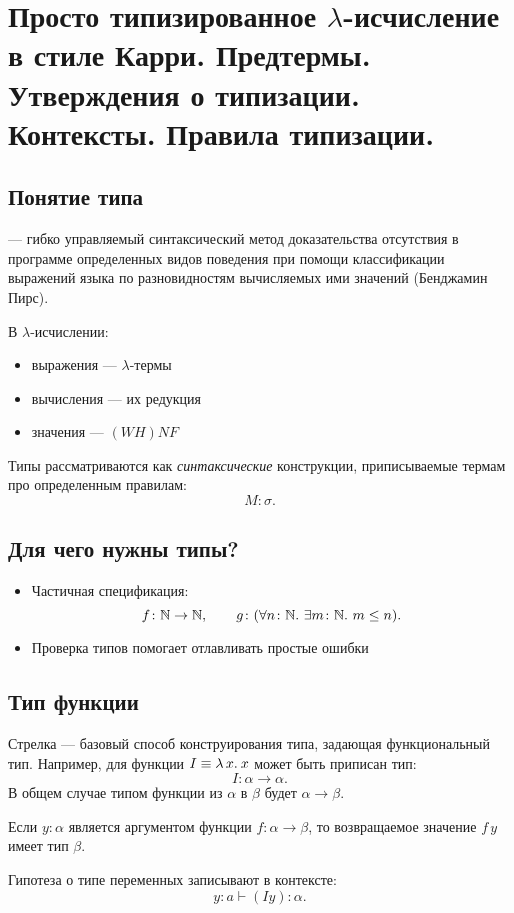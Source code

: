 \documentclass[11pt,a4paper]{article}
\begin{document}
\section{Просто типизированное $ \lambda$-исчисление в стиле Карри. Предтермы. Утверждения о типизации. Контексты. Правила типизации.}
\subsection{Понятие типа}
 --- гибко управляемый синтаксический метод доказательства отсутствия в программе определенных видов поведения при помощи классификации выражений языка по разновидностям вычисляемых ими значений (Бенджамин Пирс). 

В $ \lambda $-исчислении:
\begin{itemize}
	\item выражения --- $ \lambda$-термы
	\item вычисления --- их редукция
	\item значения ---  $ (WH)NF$
\end{itemize}
Типы рассматриваются как \textit{синтаксические} конструкции, приписываемые термам про определенным правилам:
\[
M \colon \sigma 
.\] 
\subsection{Для чего нужны типы?}
\begin{itemize}
	\item Частичная спецификация:
		\[
			f\colon \mathbb{N} \to  \mathbb{N}, \qquad g\colon ( \forall n \colon \mathbb{N}. ~ \exists m\colon \mathbb{N}. ~ m \le  n)
		.\] 
	\item Проверка типов помогает отлавливать простые ошибки
\end{itemize}
\subsection{Тип функции}
Стрелка --- базовый способ конструирования типа, задающая функциональный тип. Например, для функции $ I \equiv \lambda\,{x}.\:{x}$ может быть приписан тип:
\[
I \colon \alpha \to \alpha 
.\] 
В общем случае типом функции из $ \alpha $ в $ \beta $ будет $ \alpha \to  \beta $.

Если $ y\colon \alpha $ является аргументом функции $ f\colon \alpha  \to \beta $, то возвращаемое значение $ f \, y$ имеет тип $ \beta $.

Гипотеза о типе переменных записывают в контексте:
\[
	y\colon a \vdash (I y) \colon \alpha 
.\] 
\end{document}
